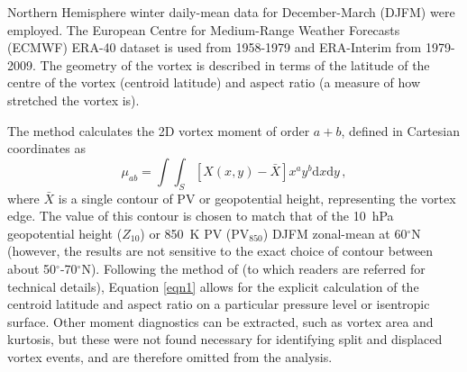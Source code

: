 Northern Hemisphere winter daily-mean data for December-March (DJFM) were
employed. The European Centre for Medium-Range Weather Forecasts (ECMWF) ERA-40
dataset \citep{Uppala2005} is used from 1958-1979 and ERA-Interim
\citep{Dee2011} from 1979-2009. The geometry of the vortex is described in terms
of the latitude of the centre of the vortex (centroid latitude) and aspect ratio
(a measure of how stretched the vortex
is).

The method calculates the 2D vortex moment of order $a+b$, defined in Cartesian
coordinates as
 \begin{equation}
 \mu_{ab} = \int \!\!\! \int_{S}[X(x,y) - \bar{X}]x^{a}y^{b}\mathrm{d}x\mathrm{d}y \, , 
 \label{eqn1}
 \end{equation}
 where $\bar{X}$ is a single contour of PV or geopotential height, representing
 the vortex edge. The value of this contour is chosen to match that of the
 10~hPa geopotential height ($Z_{10}$) or 850~K PV (PV$_{850}$) DJFM zonal-mean
 at 60$^{\circ}$N (however, the results are not sensitive to the exact choice of
 contour between about 50$^{\circ}$-70$^{\circ}$N). Following the method of
 \citet{Matthewman2009} (to which readers are referred for technical details),
 Equation \ref{eqn1} allows for the explicit calculation of the centroid
 latitude and aspect ratio on a particular pressure level or isentropic
 surface. Other moment diagnostics can be extracted, such as vortex area and
 kurtosis, but these were not found necessary for identifying split and
 displaced vortex events, and are therefore omitted from the
 analysis. %

